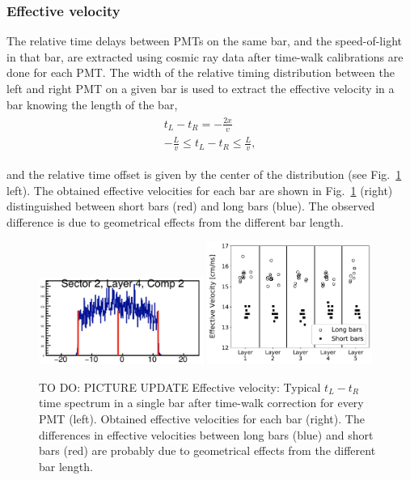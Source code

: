 \documentclass[3p,final,twocolumn]{elsarticle}
\begin{document}
\subsubsection{Effective velocity}
The relative time delays between PMTs on the same bar, and the speed-of-light in that bar, are extracted using cosmic ray 
data after time-walk calibrations are done for each PMT. The width of the relative timing distribution between the left and 
right PMT on a given bar is used to extract the effective velocity in a bar knowing the length of the bar,
\begin{eqnarray}
	\begin{split}
		t_L - t_R 	= -\frac{2x}{v}							\\
		 -\frac{L}{v}	\leq 	t_L - t_R 	\leq \frac{L}{v},				
		 \label{eqn:eff_vel}
	\end{split}
\end{eqnarray}

and the relative time offset is given by the center of the distribution (see Fig.~\ref{fig:eff_vel} left). The obtained effective velocities for each bar are shown in Fig.~\ref{fig:eff_vel} (right) distinguished between short bars (red) and long bars (blue). The observed difference is due to geometrical effects from the different bar length.

\begin{figure}[tb]
	\centering
		\includegraphics[width=0.48\textwidth]{lr_eff_vel.png}
		\includegraphics[width=0.48\textwidth]{eff_vel.pdf}
	\caption{TO DO: PICTURE UPDATE Effective velocity: Typical $t_{L} - t_{R}$ time spectrum in a single bar after time-walk correction for every PMT (left). Obtained effective velocities for each bar (right). The differences in effective velocities between long bars (blue) and short bars (red) are probably due to geometrical effects from the different bar length.}
	\label{fig:eff_vel}
\end{figure}
\end{document}
